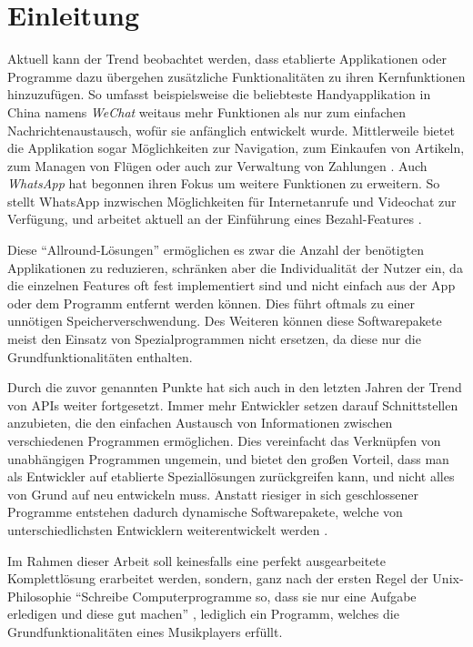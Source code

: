 
\chapter{Einleitung}
Aktuell kann der Trend beobachtet werden, dass etablierte Applikationen oder
Programme dazu übergehen zusätzliche Funktionalitäten zu ihren Kernfunktionen
hinzuzufügen. So umfasst beispielsweise die beliebteste Handyapplikation in China namens
\textit{WeChat} weitaus mehr Funktionen als nur zum einfachen
Nachrichtenaustausch, wofür sie anfänglich entwickelt wurde. Mittlerweile
bietet die Applikation sogar Möglichkeiten zur Navigation, zum
Einkaufen von Artikeln, zum Managen von Flügen oder auch zur Verwaltung von
Zahlungen \autocite{was_ist_wechat?_2019}. Auch \textit{WhatsApp} hat begonnen ihren
Fokus um weitere Funktionen zu erweitern. So stellt WhatsApp inzwischen
Möglichkeiten für Internetanrufe und Videochat zur Verfügung, und arbeitet
aktuell an der Einführung eines Bezahl-Features \autocite{shead_2019}. \hfill


Diese \enquote{Allround-Lösungen} ermöglichen es zwar die Anzahl der
benötigten Applikationen zu reduzieren, schränken aber die Individualität der
Nutzer ein, da die einzelnen Features oft fest implementiert sind und nicht
einfach aus der App oder dem Programm entfernt werden können. Dies führt
oftmals zu einer unnötigen Speicherverschwendung. Des Weiteren können diese
Softwarepakete meist den Einsatz von Spezialprogrammen nicht ersetzen, da diese
nur die Grundfunktionalitäten enthalten. \hfill


Durch die zuvor genannten Punkte hat sich auch in den letzten Jahren der Trend
von \acp{API} weiter fortgesetzt. Immer mehr Entwickler setzen darauf
Schnittstellen anzubieten, die den einfachen Austausch von Informationen zwischen verschiedenen
Programmen ermöglichen. Dies vereinfacht das Verknüpfen von unabhängigen
Programmen ungemein, und bietet den großen Vorteil, dass man als Entwickler auf
etablierte Speziallösungen zurückgreifen kann, und nicht alles von Grund auf
neu entwickeln muss. Anstatt riesiger in sich geschlossener Programme entstehen dadurch
dynamische Softwarepakete, welche von unterschiedlichsten Entwicklern
weiterentwickelt werden \autocite{babati_2018} \autocite{sandoval_2018}. \hfill
\break

Im Rahmen dieser Arbeit soll keinesfalls eine perfekt ausgearbeitete
Komplettlösung erarbeitet werden, sondern, ganz nach der ersten Regel der
Unix-Philosophie \enquote{Schreibe Computerprogramme so, dass sie nur eine
Aufgabe erledigen und diese gut machen} \autocite{gancarz_1997}, lediglich ein
Programm, welches die Grundfunktionalitäten eines Musikplayers erfüllt.


